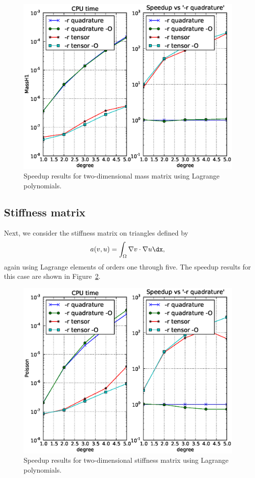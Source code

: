 \begin{figure}
  \begin{center}
    \includegraphics[width=12cm]{chapters/kirby-3/eps/MassH1.eps}
    \caption{Speedup results for two-dimensional mass matrix using Lagrange polynomials.}
    \label{fig:MassH1}
  \end{center}
\end{figure}

\subsection{Stiffness matrix}

Next, we consider the stiffness matrix on triangles defined by
\begin{equation}
a(v, u) = \int_{\Omega} \nabla v \cdot \nabla u \dx,
\end{equation}
again using Lagrange elements of orders one through five. The speedup
results for this case are shown in Figure~\ref{fig:Poisson}.

\begin{figure}
  \begin{center}
    \includegraphics[width=12cm]{chapters/kirby-3/eps/Poisson.eps}
    \caption{Speedup results for two-dimensional stiffness matrix using Lagrange polynomials.}
    \label{fig:Poisson}
  \end{center}
\end{figure}

